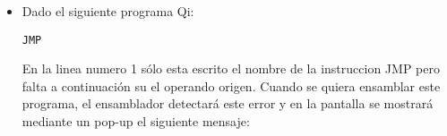 \begin{itemize}

\item Dado el siguiente programa Qi:

\begin{verbatim}
JMP
\end{verbatim}

En la linea numero 1 sólo esta escrito el nombre de la instruccion JMP pero falta a continuación su el operando origen. Cuando se quiera ensamblar este programa, el ensamblador detectará este error y en la pantalla se mostrará mediante un pop-up el siguiente mensaje:

 

\end{itemize}